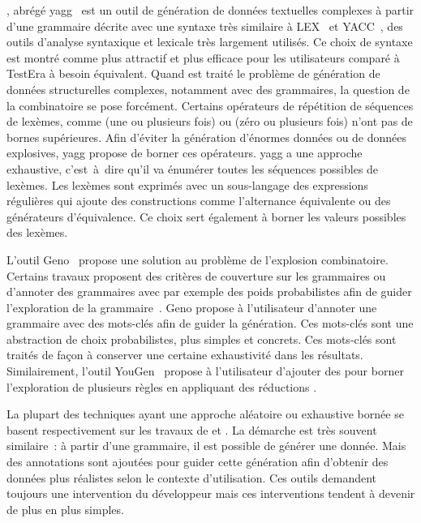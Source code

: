 , abrégé yagg~ est
un outil de génération de données textuelles complexes à partir d'une grammaire
décrite avec une syntaxe très similaire à LEX~ et
YACC~, des outils d'analyse syntaxique et lexicale très
largement utilisés. Ce choix de syntaxe est montré comme plus attractif et plus
efficace pour les utilisateurs comparé à TestEra à besoin équivalent. Quand est
traité le problème de génération de données structurelles complexes, notamment
avec des grammaires, la question de la combinatoire se pose forcément. Certains
opérateurs de répétition de séquences de lexèmes, comme \code{+} (une ou
plusieurs fois) ou \code{*} (zéro ou plusieurs fois) n'ont pas de bornes
supérieures. Afin d'éviter la génération d'énormes données ou de données
explosives, yagg propose de borner ces opérateurs. yagg a une approche
exhaustive, c'est~à~dire qu'il va énumérer toutes les séquences possibles de
lexèmes. Les lexèmes sont exprimés avec un sous-langage des expressions
régulières qui ajoute des constructions comme l'alternance équivalente ou des
générateurs d'équivalence.  Ce choix sert également à borner les valeurs
possibles des lexèmes.

L'outil Geno~ propose une solution au problème de l'explosion
combinatoire. Certains travaux proposent des critères de couverture sur les
grammaires ou d'annoter des grammaires avec par exemple des poids probabilistes
afin de guider l'exploration de la grammaire~. Geno propose à l'utilisateur d'annoter une grammaire avec
des mots-clés afin de guider la génération. Ces mots-clés sont une abstraction
de choix probabilistes,  plus simples et concrets. Ces
mots-clés sont traités de façon à conserver une certaine exhaustivité dans les
résultats. Similairement, l'outil YouGen~ propose à
l'utilisateur d'ajouter des  pour borner l'exploration de
plusieurs règles en appliquant des réductions .

La plupart des techniques ayant une approche aléatoire ou exhaustive bornée se
basent respectivement sur les travaux de  et
. La démarche est très souvent similaire~: à partir d'une
grammaire, il est possible de générer une donnée. Mais des annotations sont
ajoutées pour guider cette génération afin d'obtenir des données plus réalistes
selon le contexte d'utilisation. Ces outils demandent toujours une intervention
du développeur mais ces interventions tendent à devenir de plus en plus simples.

